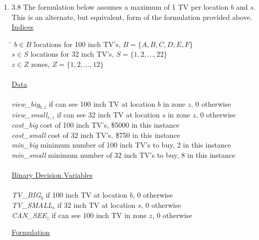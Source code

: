 \documentclass[10pt]{article}
\begin{document}
\begin{enumerate}
\newpage

\item 3.8 The formulation below assumes a maximum of 1 TV per location $b$ and $s$.  This is an alternate, but equivalent, form of the formulation provided above.\\

\noindent\underline{Indices}
\begin{tabbing}
\hspace{.5cm} \= $b\in B$ \hspace{2.5cm} \= locations for 100 inch TV's, $B=\{A,B,C,D,E,F\}$ \\
\> $s\in S$ \> locations for 32 inch TV's, $S=\{1,2,...,22\}$\\
\> $z\in Z$ \> zones, $Z=\{1,2,...,12\}$ \\

\\
\noindent\underline{Data}\\%
\\
\> {\it view\_big}$_{b,z}$  if can see 100 inch TV at location $b$ in zone $z$, 0 otherwise\\
\> {\it view\_small}$_{s,z}$  if can see 32 inch TV at location $s$ in zone $z$, 0 otherwise\\
\> {\it cost\_big} \> cost of 100 inch TV's, \$5000 in this instance\\
\> {\it cost\_small} \> cost of 32 inch TV's, \$750 in this instance\\
\> {\it min\_big} \> minimum number of 100 inch TV's to buy, 2 in this instance \\
\> {\it min\_small} \> minimum number of 32 inch TV's to buy, 8 in this instance \\
\\

\noindent\underline{Binary Decision Variables}\\%
\\
\> {\it TV\_BIG}$_{b}$  if 100 inch TV at location $b$, 0 otherwise  \\
\> {\it TV\_SMALL}$_{s}$  if 32 inch TV at location $s$, 0 otherwise \\
\> {\it CAN\_SEE}$_z$  if can see 100 inch TV in zone $z$, 0 otherwise\\
\end{tabbing}


\noindent\underline{Formulation}


\end{enumerate}
\end{document}
